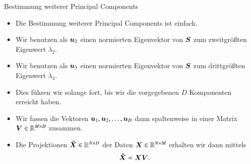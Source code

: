 \begin{frame}{Bestimmung weiterer Principal Components}{}
	\begin{itemize}
		\item Die Bestimmung weiterer Principal Components ist einfach.
		\item Wir benutzen als $\bm{u}_2$ einen normierten Eigenvektor von $\bm{S}$ zum zweitgrößten Eigenwert $\lambda_2$.
		\item Wir benutzen als $\bm{u}_3$ einen normierten Eigenvektor von $\bm{S}$ zum drittgrößten Eigenwert $\lambda_3$.
		\item Dies führen wir solange fort, bis wir die vorgegebenen $D$ Komponenten erreicht haben.
		\item Wir fassen die Vektoren $\bm{u}_1, \bm{u}_2, \ldots, \bm{u}_D$ dann spaltenweise in einer Matrix $\bm{V} \in \mathbb{R}^{M \times D}$ zusammen.
		\item Die Projektionen $\bm{\tilde{X}} \in \mathbb{R}^{N \times D}$ der Daten $\bm{X} \in \mathbb{R}^{N \times M}$ erhalten wir dann mittels
		\begin{equation}
			\bm{\tilde{X}} = \bm{X} \bm{V}.
		\end{equation}
	\end{itemize}
\end{frame}


